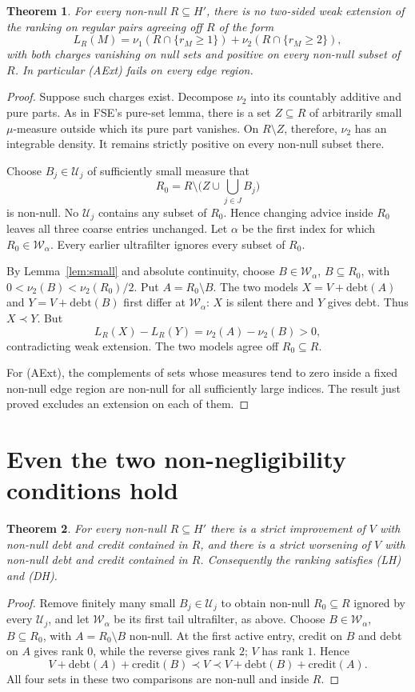 \documentclass[11pt]{article}
\newtheorem{theorem}{Theorem}
\theoremstyle{remark}\newtheorem{remark}[theorem]{Remark}
\newcommand{\U}{\mathcal U}
\newcommand{\W}{\mathcal W}
\newcommand{\debt}{\mathrm{debt}}
\newcommand{\cred}{\mathrm{credit}}
\begin{document}
\begin{theorem}\label{thm:nolocal}
For every non-null $R\subseteq H'$, there is no two-sided weak
extension of the ranking on regular pairs agreeing off $R$ of the form
\[
 L_R(M)=\nu_1(R\cap\{r_M\ge1\})+
        \nu_2(R\cap\{r_M\ge2\}),
\]
with both charges vanishing on null sets and positive on every
non-null subset of $R$. In particular (AExt) fails on every edge region.
\end{theorem}
\begin{proof}
Suppose such charges exist. Decompose $\nu_2$ into its countably
additive and pure parts. As in FSE's pure-set lemma, there is a set
$Z\subseteq R$ of arbitrarily small $\mu$-measure outside which its
pure part vanishes. On $R\setminus Z$, therefore, $\nu_2$ has an
integrable density. It remains strictly positive on every non-null
subset there.

Choose $B_j\in\U_j$ of sufficiently small measure that
\[
 R_0=R\setminus\bigl(Z\cup\textstyle\bigcup_{j\in J}B_j\bigr)
\]
is non-null. No $\U_j$ contains any subset of $R_0$. Hence changing
advice inside $R_0$ leaves all three coarse entries unchanged.
Let $\alpha$ be the first index for which $R_0\in\W_\alpha$.
Every earlier ultrafilter ignores every subset of $R_0$.

By Lemma~\ref{lem:small} and absolute continuity, choose
$B\in\W_\alpha$, $B\subseteq R_0$, with
$0<\nu_2(B)<\nu_2(R_0)/2$. Put $A=R_0\setminus B$.
The two models $X=V+\debt(A)$ and $Y=V+\debt(B)$ first differ at
$\W_\alpha$: $X$ is silent there and $Y$ gives debt. Thus $X\prec Y$.
But
\[
 L_R(X)-L_R(Y)=\nu_2(A)-\nu_2(B)>0,
\]
contradicting weak extension. The two models agree off $R_0\subseteq R$.

For (AExt), the complements of sets whose measures tend to zero inside
a fixed non-null edge region are non-null for all sufficiently large
indices. The result just proved excludes an extension on each of them.
\end{proof}

\section{Even the two non-negligibility conditions hold}

\begin{theorem}\label{thm:LHDH}
For every non-null $R\subseteq H'$ there is a strict improvement of $V$
with non-null debt and credit contained in $R$, and there is a strict
worsening of $V$ with non-null debt and credit contained in $R$.
Consequently the ranking satisfies (LH) and (DH).
\end{theorem}
\begin{proof}
Remove finitely many small $B_j\in\U_j$ to obtain non-null
$R_0\subseteq R$ ignored by every $\U_j$, and let $\W_\alpha$ be its
first tail ultrafilter, as above. Choose $B\in\W_\alpha$, $B\subseteq R_0$,
with $A=R_0\setminus B$ non-null. At the first active entry, credit on
$B$ and debt on $A$ gives rank $0$, while the reverse gives rank $2$;
$V$ has rank $1$. Hence
\[
 V+\debt(A)+\cred(B)\prec V
 \prec V+\debt(B)+\cred(A).
\]
All four sets in these two comparisons are non-null and inside $R$.
\end{proof}
\end{document}
